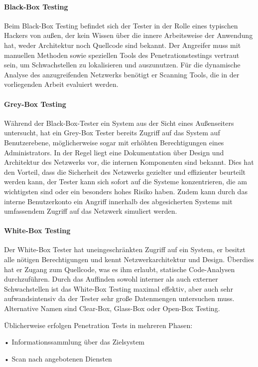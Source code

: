 \documentclass[12pt,oneside,a4paper,parskip]{scrbook}
\begin{document}
    \paragraph{Black-Box Testing}
    Beim Black-Box Testing befindet sich der Tester in der Rolle eines typischen Hackers von
    außen, der kein Wissen über die innere Arbeitsweise der Anwendung hat, weder Architektur noch
    Quellcode sind bekannt. Der Angreifer muss mit manuellen Methoden sowie speziellen Tools des Penetrationstestings vertraut sein, um Schwachstellen zu lokalisieren und auszunutzen. Für die dynamische Analyse des anzugreifenden Netzwerks benötigt er Scanning Tools, die in der vorliegenden Arbeit evaluiert werden.
    \paragraph{Grey-Box Testing}
    Während der Black-Box-Tester ein System aus der Sicht eines Außenseiters untersucht, hat ein    Grey-Box Tester bereits Zugriff auf das System auf Benutzerebene, möglicherweise sogar mit erhöhten Berechtigungen eines Administrators. In der Regel liegt eine Dokumentation über Design und Architektur des Netzwerks vor, die internen Komponenten sind bekannt. Dies hat den Vorteil, dass die Sicherheit des Netzwerks gezielter und effizienter beurteilt werden kann, der Tester kann sich sofort auf die Systeme konzentrieren, die am wichtigsten sind oder ein besonders hohes Risiko haben. Zudem kann durch das interne Benutzerkonto ein Angriff innerhalb des abgesicherten Systems mit umfassendem Zugriff auf das Netzwerk simuliert werden.
    \paragraph{White-Box Testing}
    Der White-Box Tester hat uneingeschränkten Zugriff auf ein System, er besitzt alle nötigen Berechtigungen und kennt Netzwerkarchitektur und Design. Überdies hat er Zugang zum Quellcode, was es ihm erlaubt, statische Code-Analysen durchzuführen. Durch das Auffinden sowohl interner als auch externer Schwachstellen ist das White-Box Testing maximal effektiv, aber auch sehr aufwandsintensiv da der Tester sehr große Datenmengen untersuchen muss.
    Alternative Namen sind Clear-Box, Glass-Box oder Open-Box Testing.

    Üblicherweise erfolgen Penetration Tests in mehreren Phasen:

    • Informationssammlung über das Zielsystem

    • Scan nach angebotenen Diensten
\end{document}
